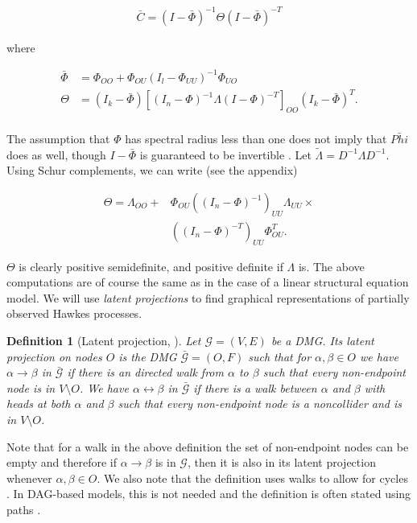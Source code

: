 \documentclass[accepted]{uai2021} %
\newtheorem{defn}[thm]{Definition}
\begin{document}
\begin{align}
\bar{C} = (I - \bar{\Phi})^{-1}\Theta(I - \bar{\Phi})^{-T}
\end{align}

where 

\begin{align*}
\bar{\Phi} & = {\Phi}_{OO} +  {\Phi}_{OU}(I_l - 
{\Phi}_{UU})^{-1}{\Phi}_{UO} \\
\Theta & = (I_k-\bar{\Phi})[(I_n - {\Phi})^{-1}{\Lambda}(I - 
{\Phi})^{-T}]_{OO}(I_k-\bar{\Phi})^T. \\
\end{align*}

The assumption that $\Phi$ has spectral radius less than one does not imply 
that $\bar{Phi}$ does as well, though $I - \bar{\Phi}$ is guaranteed to be 
invertible \cite{hyttinen2012}. Let 
$\tilde{\Lambda} 
= D^{-1}\Lambda D^{-1}$. Using Schur complements, we can write (see the 
appendix)

\begin{align*}
\Theta =  {\Lambda}_{OO} + & {\Phi}_{OU}((I_n - 
{\Phi})^{-1})_{UU}{\Lambda}_{UU} \times  \\ & ((I_n - 
{\Phi})^{-T})_{UU}
{\Phi}_{OU}^T.
\end{align*}

$\Theta$ is clearly positive semidefinite, and positive definite if 
$\Lambda$ is. The above computations are of course the same as in the case of a 
linear 
structural equation model. We will use \emph{latent projections} to find 
graphical representations of partially observed Hawkes processes.

\begin{defn}[Latent projection, \cite{vermaEquiAndSynthesis,richardson2017}]
	\label{def:latProj}
	Let $\mathcal{G} = (V,E)$ be a DMG. Its latent projection on nodes $O$ is 
	the DMG $\bar{\mathcal{G}} = (O,F)$ such that for $\alpha,\beta\in O$ we 
	have $\alpha\rightarrow\beta$ in $\bar{\mathcal{G}}$ if there is an 
	directed walk from $\alpha$ to $\beta$ such that every non-endpoint node is 
	in $V\setminus O$. We have 
	$\alpha\leftrightarrow\beta$ in $\bar{\mathcal{G}}$ if there is a walk 
	between $\alpha$ and $\beta$ with heads at 
	both $\alpha$ and $\beta$ such that every non-endpoint node is a 
	noncollider and is in 
	$V\setminus O$.
\end{defn}

Note that for a walk in the above definition the set of non-endpoint nodes can 
be empty and therefore if $\alpha\rightarrow\beta$ is in $\mathcal{G}$, then it 
is 
also in its latent projection whenever $\alpha,\beta\in O$. We also note that 
the definition uses walks to 
allow for cycles \citep{mogensen2018}. In DAG-based models, this is 
not needed 
and the definition is often stated using paths 
\citep{richardson2017}.
\end{document}

